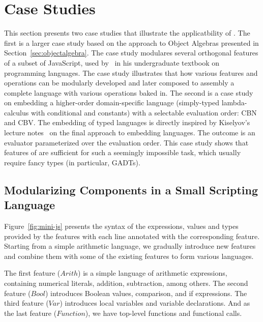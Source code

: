 \section{Case Studies}

This section presents two case studies that illustrate the applicatbility of
\name. The first is a larger case study based on the approach to Object Algebras
presented in Section~\ref{sec:objectalgebra}. The case study modulares several
orthogonal features of a subset of JavaScript, used by~\citet{poplcook} in his
undergraduate textbook on programming languages. The case study illustrates that
how various features and operations can be modularly developed and later
composed to assembly a complete language with various operations baked in. The
second is a case study on embedding a higher-order domain-specific language
(simply-typed lambda-calculus with conditional and constants) with a selectable
evaluation order: CBN and CBV. The embedding of typed languages is directly
inspired by Kiselyov's lecture notes~\cite{kiselyov2012typed} on the final
approach to embedding languages. The outcome is an evaluator parameterized over
the evaluation order. This case study shows that features of \name are
sufficient for such a seemingly impossible task, which usually require fancy
types (in particular, GADTs).


\subsection{Modularizing Components in a Small Scripting Language}

Figure~\ref{fig:mini-js} presents the syntax of the expressions, values and
types provided by the features with each line annotated with the corresponding
feature. Starting from a simple arithmetic language, we gradually introduce new
features and combine them with some of the existing features to form various
languages.

The first feature ($\mathit{Arith}$) is a simple language of arithmetic
expressions, containing numerical literals, addition, subtraction, among others.
The second feature ($\mathit{Bool}$) introduces Boolean values, comparison, and
if expressions. The third feature ($\mathit{Var}$) introduces local variables
and variable declarations. And as the last feature ($\mathit{Function}$), we
have top-level functions and functional calls.

